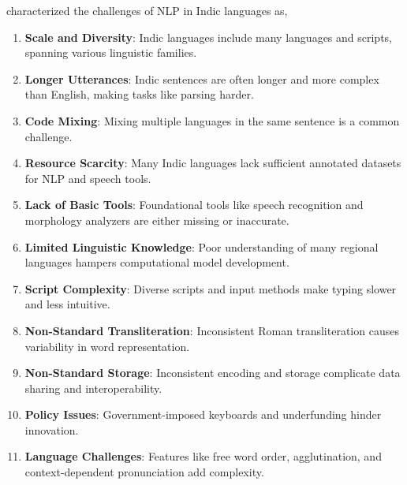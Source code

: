 \citet{bhattacharyya_indic_2019} characterized the challenges of NLP in Indic
languages as,
\begin{enumerate}
    \item \textbf{Scale and Diversity}: Indic languages include many languages and scripts, spanning various linguistic families.
    \item \textbf{Longer Utterances}: Indic sentences are often longer and more complex than English, making tasks like parsing harder.
    \item \textbf{Code Mixing}: Mixing multiple languages in the same sentence is a common challenge.
    \item \textbf{Resource Scarcity}: Many Indic languages lack sufficient annotated datasets for NLP and speech tools.
    \item \textbf{Lack of Basic Tools}: Foundational tools like speech recognition and morphology analyzers are either missing or inaccurate.
    \item \textbf{Limited Linguistic Knowledge}: Poor understanding of many regional languages hampers computational model development.
    \item \textbf{Script Complexity}: Diverse scripts and input methods make typing slower and less intuitive.
    \item \textbf{Non-Standard Transliteration}: Inconsistent Roman transliteration causes variability in word representation.
    \item \textbf{Non-Standard Storage}: Inconsistent encoding and storage complicate data sharing and interoperability.
    \item \textbf{Policy Issues}: Government-imposed keyboards and underfunding hinder innovation.
    \item \textbf{Language Challenges}: Features like free word order, agglutination, and context-dependent pronunciation add complexity.
\end{enumerate}





